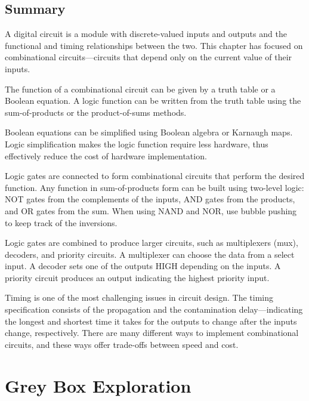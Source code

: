 \documentclass[12pt]{article}
\begin{document}
\subsection{Summary}

A digital circuit is a module with discrete-valued inputs and outputs and the functional and timing relationships between the two. This chapter has focused on combinational circuits---circuits that depend only on the current value of their inputs.

The function of a combinational circuit can be given by a truth table or a Boolean equation. A logic function can be written from the truth table using the sum-of-products or the product-of-sums methods.

Boolean equations can be simplified using Boolean algebra or Karnaugh maps. Logic simplification makes the logic function require less hardware, thus effectively reduce the cost of hardware implementation.

Logic gates are connected to form combinational circuits that perform the desired function. Any function in sum-of-products form can be built using two-level logic: NOT gates from the complements of the inputs, AND gates from the products, and OR gates from the sum. When using NAND and NOR, use bubble pushing to keep track of the inversions.

Logic gates are combined to produce larger circuits, such as multiplexers (mux), decoders, and priority circuits. A multiplexer can choose the data from a select input. A decoder sets one of the outputs HIGH depending on the inputs. A priority circuit produces an output indicating the highest priority input.

Timing is one of the most challenging issues in circuit design. The timing specification consists of the propagation and the contamination delay---indicating the longest and shortest time it takes for the outputs to change after the inputs change, respectively. There are many different ways to implement combinational circuits, and these ways offer trade-offs between speed and cost.

\section{Grey Box Exploration}
\end{document}
